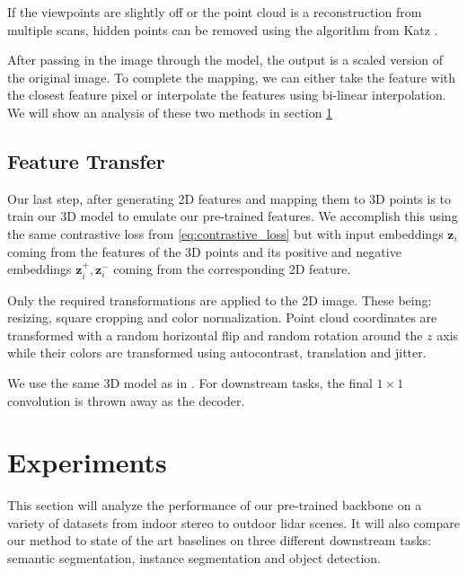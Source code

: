 \documentclass[10pt,twocolumn,letterpaper]{article}
\newcommand{\AJ}[1]{{\color{red}{[Andrej: #1]}}}
\begin{document}
If the viewpoints are slightly off or the point cloud is a reconstruction from multiple scans, hidden points can be removed using the algorithm from Katz \etal \cite{katz2007Direct}.

After passing in the image through the model, the output is a scaled version of the original image. To complete the mapping, we can either take the feature with the closest feature pixel or interpolate the features using bi-linear interpolation. We will show an analysis of these two methods in section \ref{sec:results}

\AJ{Do I need to give the equation for Bi-linear interpolation or is this also considered basic knowledge}

\subsection{Feature Transfer}
\label{sec:featureTransfer}

Our last step, after generating 2D features and mapping them to 3D points is to train our 3D model to emulate our pre-trained features. We accomplish this using the same contrastive loss from \ref{eq:contrastive_loss} but with input embeddings $\mathbf{z}_i$ coming from the features of the 3D points and its positive and negative embeddings $\mathbf{z}_i^{+},\mathbf{z}_i^{-}$ coming from the corresponding 2D feature.

Only the required transformations are applied to the 2D image. These being: resizing, square cropping and color normalization. Point cloud coordinates are transformed with a random horizontal flip and random rotation around the $z$ axis while their colors are transformed using autocontrast, translation and jitter.

We use the same 3D model as in \cite{xie2020pointcontrast}. For downstream tasks, the final $1\times1$ convolution is thrown away as the decoder.

\AJ{Need to look at not using a projection head in 3D model.}

\clearpage
\section{Experiments}
\label{sec:results}

This section will analyze the performance of our pre-trained backbone on a variety of datasets from indoor stereo to outdoor lidar scenes. It will also compare our method to state of the art baselines on three different downstream tasks: semantic segmentation, instance segmentation and object detection.
\end{document}

